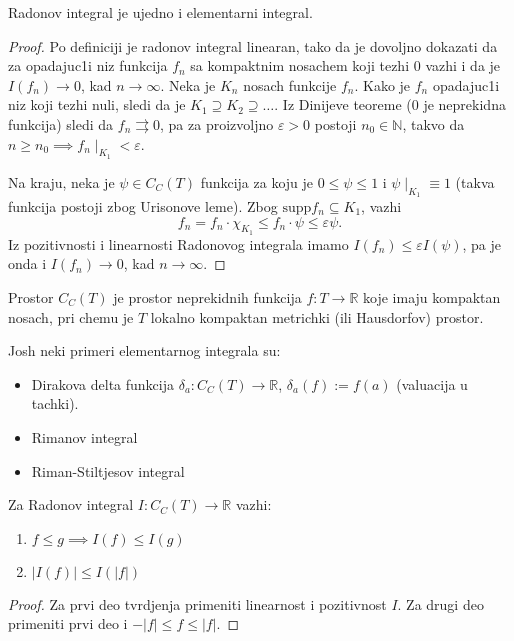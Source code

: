 \documentclass[a4paper,12pt]{article}
\newcommand{\NN}{\mathbb{N}}
\newcommand{\RR}{\mathbb{R}}
\newcommand{\eps}{\varepsilon}
\newcommand{\psj}{\subseteq}
\begin{document}
\begin{tvr}
	Radonov integral je ujedno i elementarni integral.
\end{tvr}
\begin{proof}
	Po definiciji je radonov integral linearan, tako da je dovoljno dokazati da 
	za opadajuc1i niz funkcija $f_n$ sa kompaktnim nosachem koji tezhi $0$
	vazhi i da je $I(f_n) \to 0$, kad $n\to \infty$. Neka je $K_n$ nosach funkcije
	$f_n$. Kako je $f_n$ opadajuc1i niz koji tezhi nuli, sledi da je $K_1\supseteq K_2 \supseteq \dotso$.
	Iz Dinijeve teoreme ($0$ je neprekidna funkcija) sledi da $f_n\rightrightarrows 0$, pa za proizvoljno
	$\eps > 0$ postoji $n_0 \in \NN$, takvo da $n\geq n_0 \implies f_n\mid_{K_1} < \eps$.

	Na kraju, neka je $\psi \in  C_C(T)$ funkcija za koju je $0 \leq \psi \leq 1$ i $\psi \mid_{K_1} \equiv 1$ (takva
	funkcija postoji zbog Urisonove leme). Zbog $\mathrm{supp} f_n \psj K_1$, vazhi
	\[ f_n = f_n \cdot \chi_{K_1} \leq f_n \cdot \psi \leq \eps \psi .\] 
	Iz pozitivnosti i linearnosti Radonovog integrala imamo $I(f_n) \leq \eps I(\psi)$, pa je onda i $I(f_n)\to 0$, kad
	$n\to \infty$.
\end{proof}

\begin{nap}
	Prostor $C_C(T)$ je prostor neprekidnih funkcija $f:T\to \RR$ koje imaju kompaktan nosach, pri chemu je 
	$T$ lokalno kompaktan metrichki (ili Hausdorfov) prostor.
\end{nap}

\begin{pr}
	Josh neki primeri elementarnog integrala su:
	\begin{itemize}
		\item Dirakova delta funkcija $\delta_a: C_C(T)\to \RR$, $\delta_a(f):=f(a)$ (valuacija u tachki).
		\item Rimanov integral
		\item Riman-Stiltjesov integral
	\end{itemize}
\end{pr}

\begin{lema}
	Za Radonov integral $I: C_C(T) \to \RR$ vazhi:
	\begin{enumerate}
		\item $f \leq g \implies I(f) \leq I(g)$
		\item $|I(f)| \leq I(|f|)$
	\end{enumerate}
\end{lema}
\begin{proof}
	Za prvi deo tvrdjenja primeniti linearnost i pozitivnost $I$. Za drugi deo primeniti prvi deo i $-|f| \leq f \leq |f|$.
\end{proof}
\end{document}

